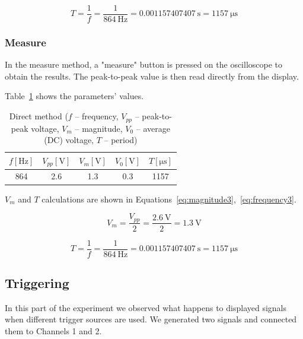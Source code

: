 \begin{equation}
	T = \frac{1}{f} = \frac{1}{\SI{864}{\hertz}} = \SI{0.001157407407}{\second} = \SI{1157}{\micro\second}
	\label{eq:frequency2}
\end{equation}


\subsubsection*{Measure}

In the measure method, a "measure" button is pressed on the oscilloscope to obtain the results. The peak-to-peak value is then read directly from the display.

Table~\ref{tab:measure-method} shows the parameters' values.

\begin{table}[H]
	\centering
	\begin{tabular}{c|c|c|c|c}
		$f [\unit{\hertz}]$ & $V_{pp} [\unit{\volt}]$ & $V_{m} [\unit{\volt}]$ & $V_{0} [\unit{\volt}]$ & $T [\unit{\micro\second}]$\\
		\hline
		864 & 2.6 & 1.3 & 0.3 & 1157
	\end{tabular}
	\caption{Direct method ($f$ -- frequency, $V_{pp}$ -- peak-to-peak voltage, $V_{m}$ -- magnitude, $V_{0}$ -- average (DC) voltage, $T$ -- period)}
	\label{tab:measure-method}
\end{table}   

$V_{m}$ and $T$ calculations are shown in Equations~\ref{eq:magnitude3},~\ref{eq:frequency3}.

\begin{equation}
	V_{m} = \frac{V_{pp}}{2} = \frac{\SI{2.6}{\volt}}{2} = \SI{1.3}{\volt}
	\label{eq:magnitude3}
\end{equation}

\begin{equation}
	T = \frac{1}{f} = \frac{1}{\SI{864}{\hertz}} = \SI{0.001157407407}{\second} = \SI{1157}{\micro\second}
	\label{eq:frequency3}
\end{equation}

\subsection{Triggering}

In this part of the experiment we observed what happens to displayed signals when different trigger sources are used. We generated two signals and connected them to Channels 1 and 2.

